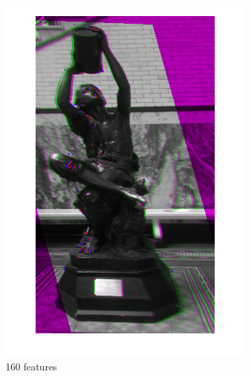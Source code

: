 \documentclass[sigconf]{acmart/acmart}
\begin{document}
\begin{figure}[h]
   	\begin{subfigure}[b]{0.3\textwidth}
    	\centering
    	\includegraphics[width=\textwidth]{figures/alignment/fused_160_features_16_iterations}
    	\caption{160 features}
    \end{subfigure}
    \begin{subfigure}[b]{0.3\textwidth}
    	\centering

\end{subfigure}
\end{figure}
\end{document}
